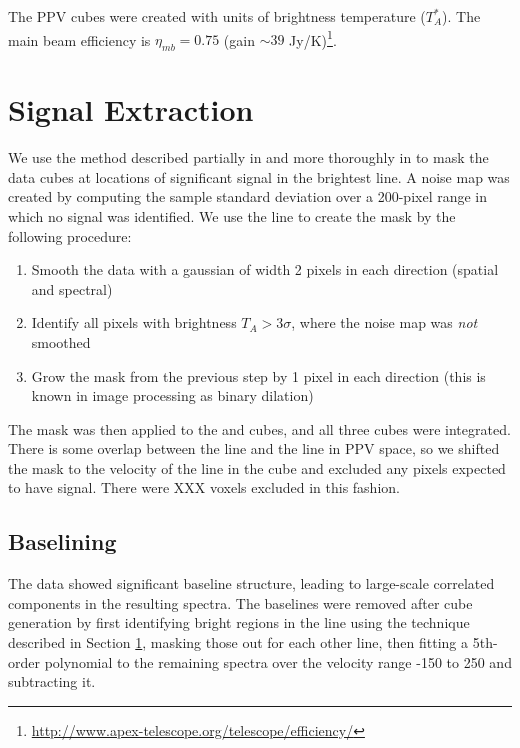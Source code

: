 
The PPV cubes were created with units of brightness temperature ($T_A^*$).  The
main beam efficiency is $\eta_{mb} = 0.75$ (gain $\sim39$
Jy/K)\footnote{\url{http://www.apex-telescope.org/telescope/efficiency/}}.


\section{Signal Extraction}
\label{sec:signal}
We use the method described partially in \citet{Ao2013a} and more thoroughly in
\citet{Dame2011b} to mask the data cubes at locations of significant signal in 
the brightest line. 
A noise map was created by computing the sample standard deviation over a
200-pixel range in which no signal was identified.
We use the \formaldehyde \threeohthree line to create the mask by
the following procedure:

\begin{enumerate}
    \item Smooth the data with a gaussian of width 2 pixels in each direction
        (spatial and spectral)
    \item Identify all pixels with brightness $T_A > 3\sigma$, where the noise
        map was \emph{not} smoothed
    \item Grow the mask from the previous step by 1 pixel in each direction
        (this is known in image processing as binary dilation)
\end{enumerate}

The \formaldehyde \threeohthree mask was then applied to the \threetwoone and
\threetwotwo cubes, and all three cubes were integrated.  There is some overlap
between the \methanol \fourtwotwo line and the \formaldehyde \threetwotwo
line in PPV space, so we shifted the \formaldehyde mask to the velocity of the
\methanol line in the \formaldehyde \threetwotwo cube and excluded any pixels
expected to have signal.  There were XXX voxels excluded in this fashion.


\subsection{Baselining}
\label{sec:baseline}
The data showed significant baseline structure, leading to large-scale
correlated components in the resulting spectra.  The baselines were removed
after cube generation by first identifying bright regions in the \para
\threeohthree line using the technique described in Section \ref{sec:signal},
masking those out for each other line, then fitting a 5th-order polynomial to
the remaining spectra over the velocity range -150 to 250 \kms and subtracting
it.

